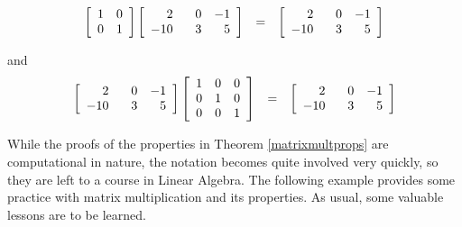 \documentclass{ximera}
\begin{document}
\[\begin{array}{rcl}
\left[ \begin{array}{rr} 1 & 0 \\ 0 & 1 \\ \end{array} \right] \left[\begin{array}{rrr} 2 & \hphantom{-}0 & -1 \\ -10 & 3 & 5 \\ \end{array} \right] & = & \left[\begin{array}{rrr} 2 & \hphantom{-}0 & -1 \\ -10 & 3 & 5 \\ \end{array} \right] \\ \end{array}\]

and
\[\begin{array}{rcl}
\left[\begin{array}{rrr} 2 & \hphantom{-}0 & -1 \\ -10 & 3 & 5 \\ \end{array} \right]\left[ \begin{array}{rrr} 1 & 0 & 0 \\ 0 & 1 & 0 \\ 0 & 0 & 1 \\ \end{array} \right] & = & \left[\begin{array}{rrr} 2 & \hphantom{-}0 & -1 \\ -10 & 3 & 5 \\ \end{array} \right] \\ \end{array}\]

While the proofs of the properties in Theorem \ref{matrixmultprops} are computational in nature, the notation becomes quite involved very quickly, so they are left to a course in Linear Algebra. The following example provides some practice with matrix multiplication and its properties.  As usual, some valuable lessons are to be learned.
\end{document}
